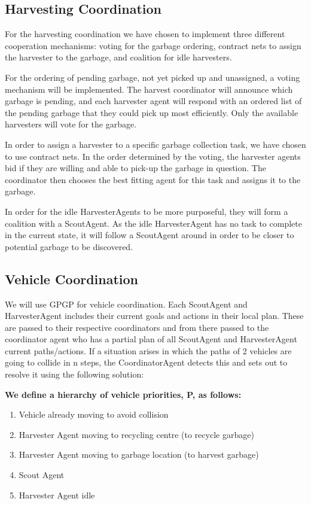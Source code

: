 \subsection{Harvesting Coordination}

For the harvesting coordination we have chosen to implement three different cooperation mechanisms: voting for the garbage ordering, contract nets to assign the harvester to the garbage, and coalition for idle harvesters. 

For the ordering of pending garbage, not yet picked up and unassigned, a voting mechanism will be implemented. The harvest coordinator will announce which garbage is pending, and each harvester agent will respond with an ordered list of the pending garbage that they could pick up most efficiently. Only the available harvesters will vote for the garbage. 

In order to assign a harvester to a specific garbage collection task, we have chosen to use contract nets. In the order determined by the voting, the harvester agents bid if they are willing and able to pick-up the garbage in question. The coordinator then chooses the best fitting agent for this task and assigns it to the garbage. 

In order for the idle HarvesterAgents to be more purposeful, they will form a coalition with a ScoutAgent. As the idle HarvesterAgent has no task to complete in the current state, it will follow a ScoutAgent around in order to be closer to potential garbage to be discovered. 

\subsection{Vehicle Coordination}

We will use GPGP for vehicle coordination. Each ScoutAgent and HarvesterAgent includes their current goals and actions in their local plan. These are passed to their respective coordinators and from there passed to the coordinator agent who has a partial plan of all ScoutAgent and HarvesterAgent current paths/actions. If a situation arises in which the paths of 2 vehicles are going to collide in n steps, the CoordinatorAgent detects this and sets out to resolve it using the following solution:

\textbf{We define a hierarchy of vehicle priorities, P, as follows:}

\begin{enumerate}
	\item Vehicle already moving to avoid collision
	\item Harvester Agent moving to recycling centre (to recycle garbage)
	\item Harvester Agent moving to garbage location (to harvest garbage)
	\item Scout Agent 
	\item Harvester Agent idle 
\end{enumerate}

